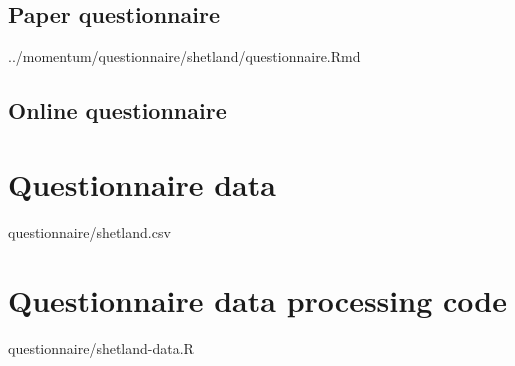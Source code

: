 \documentclass[oneside]{book}
\newcommand{\includeR}[1]{#1}
\begin{document}
\subsection{Paper questionnaire}

\includeR{../momentum/questionnaire/shetland/questionnaire.Rmd}
\subsection{Online questionnaire}

\section{Questionnaire data}
\includeR{questionnaire/shetland.csv}

\section{Questionnaire data processing code}
\label{app:questionnairedatacode}

\includeR{questionnaire/shetland-data.R}
\end{document}
